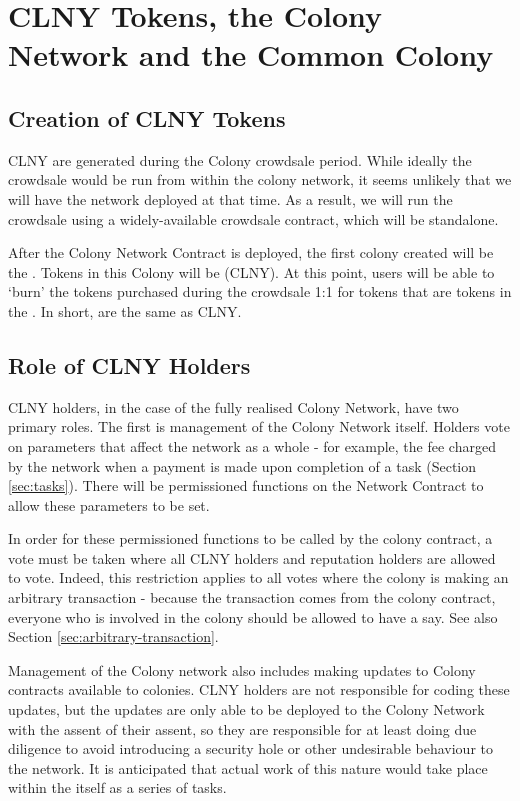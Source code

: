 \section{CLNY Tokens, the Colony Network and the Common Colony}

\subsection{Creation of CLNY Tokens}
CLNY are generated during the Colony crowdsale period. While ideally the crowdsale would be run from within the colony network, it seems unlikely that we will have the network deployed at that time. As a result, we will run the crowdsale using a widely-available crowdsale contract, which will be standalone.

After the Colony Network Contract is deployed, the first colony created will be the \rc. Tokens in this Colony will be \rct (CLNY). At this point, users will be able to `burn' the tokens purchased during the crowdsale 1:1 for tokens that are tokens in the \rc. In short, \rct are the same as CLNY.

\subsection{Role of CLNY Holders}
CLNY holders, in the case of the fully realised Colony Network, have two primary roles. The first is management of the Colony Network itself. Holders vote on parameters that affect the network as a whole - for example, the fee charged by the network when a payment is made upon completion of a task (Section \ref{sec:tasks}). There will be permissioned functions on the Network Contract to allow these parameters to be set. 

In order for these permissioned functions to be called by the colony contract, a vote must be taken where all CLNY holders and reputation holders are allowed to vote. Indeed, this restriction applies to all votes where the colony is making an arbitrary transaction - because the transaction comes from the colony contract, everyone who is involved in the colony should be allowed to have a say. See also Section \ref{sec:arbitrary-transaction}.

Management of the Colony network also includes making updates to Colony contracts available to colonies. CLNY holders are not responsible for coding these updates, but the updates are only able to be deployed to the Colony Network with the assent of their assent, so they are responsible for at least doing due diligence to avoid introducing a security hole or other undesirable behaviour to the network. It is anticipated that actual work of this nature would take place within the \rc itself as a series of tasks.

